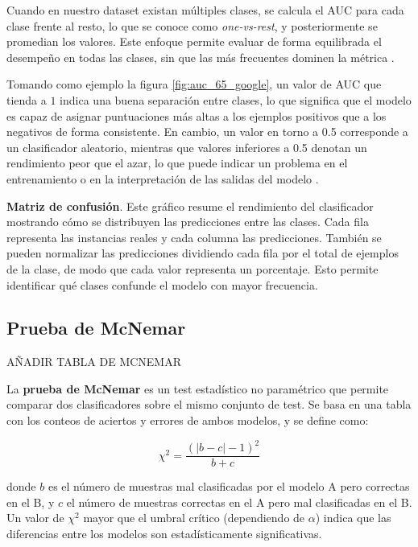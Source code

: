 Cuando en nuestro dataset existan múltiples clases, se calcula el AUC para cada clase frente al resto, lo que se conoce como \textit{one-vs-rest}, y posteriormente se promedian los valores. Este enfoque permite evaluar de forma equilibrada el desempeño en todas las clases, sin que las más frecuentes dominen la métrica \cite{googledev-rocauc}.

Tomando como ejemplo la figura \ref{fig:auc_65_google}, un valor de AUC que tienda a $1$ indica una buena separación entre clases, lo que significa que el modelo es capaz de asignar puntuaciones más altas a los ejemplos positivos que a los negativos de forma consistente. En cambio, un valor en torno a 0.5 corresponde a un clasificador aleatorio, mientras que valores inferiores a 0.5 denotan un rendimiento peor que el azar, lo que puede indicar un problema en el entrenamiento o en la interpretación de las salidas del modelo \cite{dl_python__chollet_2021}.

\textbf{Matriz de confusión}. Este gráfico resume el rendimiento del clasificador mostrando cómo se distribuyen las predicciones entre las clases. Cada fila representa las instancias reales y cada columna las predicciones. También se pueden normalizar las predicciones dividiendo cada fila por el total de ejemplos de la clase, de modo que cada valor representa un porcentaje. Esto permite identificar qué clases confunde el modelo con mayor frecuencia.

\subsection*{Prueba de McNemar}

{\color{red} AÑADIR TABLA DE MCNEMAR}

La \textbf{prueba de McNemar} es un test estadístico no paramétrico que permite comparar dos clasificadores sobre el mismo conjunto de test.
Se basa en una tabla con los conteos de aciertos y errores de ambos modelos, y se define como:

\begin{equation}
	\chi^2 = \frac{(|b - c| - 1)^2}{b + c}
	\label{eq:mcnemar}
\end{equation}

donde $b$ es el número de muestras mal clasificadas por el modelo A pero correctas en el B, y $c$ el número de muestras correctas en el A pero mal clasificadas en el B.
Un valor de $\chi^2$ mayor que el umbral crítico (dependiendo de $\alpha$) indica que las diferencias entre los modelos son estadísticamente significativas.

